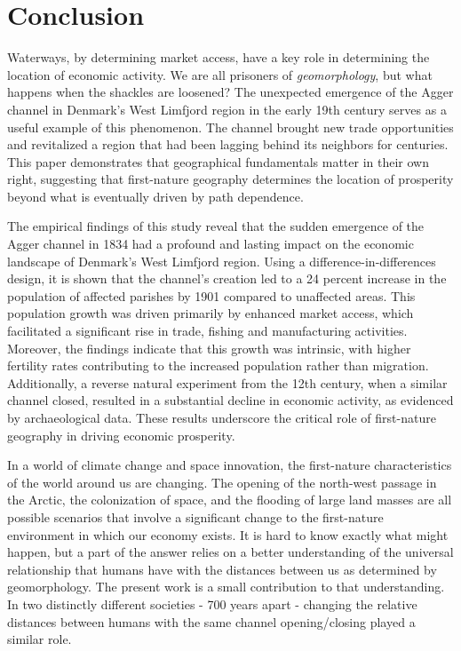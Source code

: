 \documentclass[11pt]{article}
\begin{document}
\begin{landscape}
\begin{table}
{}
\end{table}
\end{landscape}

\FloatBarrier
\section{Conclusion}
Waterways, by determining market access, have a key role in determining the location of economic activity. We are all prisoners of \textit{geomorphology}, but what happens when the shackles are loosened? The unexpected emergence of the Agger channel in Denmark's West Limfjord region in the early 19th century serves as a useful example of this phenomenon. The channel brought new trade opportunities and revitalized a region that had been lagging behind its neighbors for centuries. This paper demonstrates that geographical fundamentals matter in their own right, suggesting that first-nature geography determines the location of prosperity beyond what is eventually driven by path dependence.

The empirical findings of this study reveal that the sudden emergence of the Agger channel in 1834 had a profound and lasting impact on the economic landscape of Denmark's West Limfjord region. Using a difference-in-differences design, it is shown that the channel's creation led to a 24 percent increase in the population of affected parishes by 1901 compared to unaffected areas. This population growth was driven primarily by enhanced market access, which facilitated a significant rise in trade, fishing and manufacturing activities. Moreover, the findings indicate that this growth was intrinsic, with higher fertility rates contributing to the increased population rather than migration. Additionally, a reverse natural experiment from the 12th century, when a similar channel closed, resulted in a substantial decline in economic activity, as evidenced by archaeological data. These results underscore the critical role of first-nature geography in driving economic prosperity.

In a world of climate change and space innovation, the first-nature characteristics of the world around us are changing. The opening of the north-west passage in the Arctic, the colonization of space, and the flooding of large land masses are all possible scenarios that involve a significant change to the first-nature environment in which our economy exists. It is hard to know exactly what might happen, but a part of the answer relies on a better understanding of the universal relationship that humans have with the distances between us as determined by geomorphology. The present work is a small contribution to that understanding. In two distinctly different societies - 700 years apart - changing the relative distances between humans with the same channel opening/closing played a similar role. 
\end{document}
